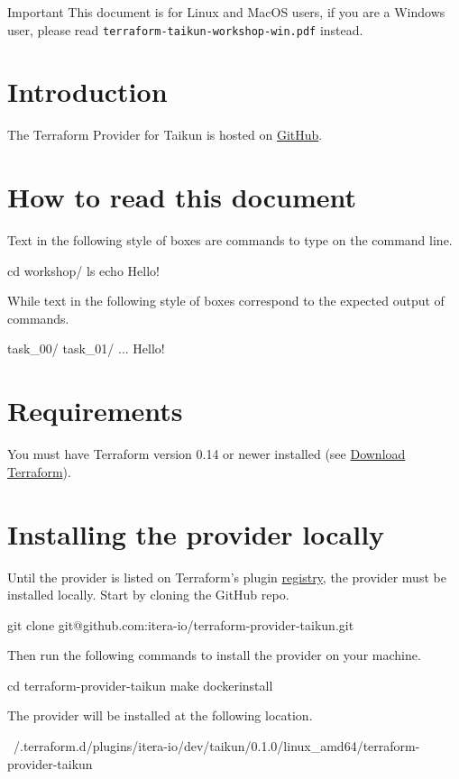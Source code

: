 \begin{important}{Important}
  This document is for Linux and MacOS users, if you are a Windows user, please read \texttt{terraform-taikun-workshop-win.pdf} instead.
\end{important}

\section{Introduction}

The Terraform Provider for Taikun is hosted on \href{https://github.com/itera-io/terraform-provider-taikun}{GitHub}.
\blindtext{}

\section{How to read this document}

Text in the following style of boxes are commands to type on the command line.
\begin{shell}
cd workshop/
ls
echo Hello!
\end{shell}
While text in the following style of boxes correspond to the expected output of commands.
\begin{raw}
task_00/
task_01/
...
Hello!
\end{raw}

\section{Requirements}
You must have Terraform version 0.14 or newer installed (see \href{https://www.terraform.io/downloads.html}{Download Terraform}).

\section{Installing the provider locally}
Until the provider is listed on Terraform's plugin \href{https://registry.terraform.io/browse/providers}{registry}, the provider must be installed locally.
Start by cloning the GitHub repo.
\begin{shell}
git clone git@github.com:itera-io/terraform-provider-taikun.git
\end{shell}
Then run the following commands to install the provider on your machine.
\begin{shell}
cd terraform-provider-taikun
make dockerinstall
\end{shell}
The provider will be installed at the following location.
\begin{raw}
~/.terraform.d/plugins/itera-io/dev/taikun/0.1.0/linux_amd64/terraform-provider-taikun
\end{raw}

